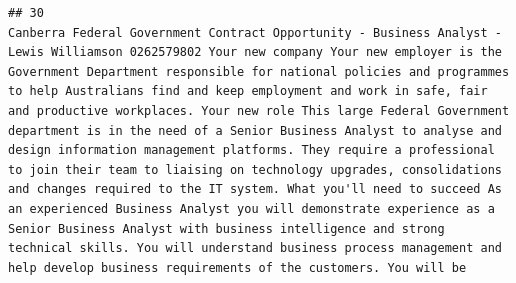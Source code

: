 \documentclass[11pt,a4paper,]{article}
\begin{document}
\begin{verbatim}
## 30                                                                                                                                                                                                                                                                                                                                                                                                                                                                                                                                                                                                                                                                                                                                                                                                                                                                                                                                                                                                                                                                                                                                                                                                                                                                                                                                                                                                                                                                                                                                                                                                                                                                                                                                                                                                                                                                                                                                                                                                                                                                                                                                                                                                                                                                                                                                                                                                                                                                                                                 Canberra Federal Government Contract Opportunity - Business Analyst - Lewis Williamson 0262579802 Your new company Your new employer is the Government Department responsible for national policies and programmes to help Australians find and keep employment and work in safe, fair and productive workplaces. Your new role This large Federal Government department is in the need of a Senior Business Analyst to analyse and design information management platforms. They require a professional to join their team to liaising on technology upgrades, consolidations and changes required to the IT system. What you'll need to succeed As an experienced Business Analyst you will demonstrate experience as a Senior Business Analyst with business intelligence and strong technical skills. You will understand business process management and help develop business requirements of the customers. You will be 
\end{verbatim}
\end{document}

